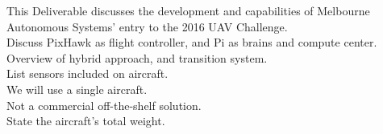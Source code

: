 This Deliverable discusses the development and capabilities of Melbourne Autonomous Systems' entry to the 2016 UAV Challenge.\\

Discuss PixHawk as flight controller, and Pi as brains and compute center.\\

Overview of hybrid approach, and transition system.\\

List sensors included on aircraft.\\

We will use a single aircraft.\\

Not a commercial off-the-shelf solution.\\

State the aircraft's total weight.\\